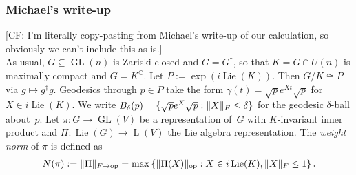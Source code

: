 \documentclass{article}
\DeclareMathOperator{\Lie}{Lie}
\DeclareMathOperator{\Lin}{L}
\DeclareMathOperator{\ope}{op}
\DeclarePairedDelimiter{\norm}{\lVert}{\rVert}
\newcommand{\ot}{\otimes}
\newcommand\GL{\operatorname{GL}}
\newcommand{\CF}[1]{{\color{purple}[CF: #1]}}
\begin{document}



\subsubsection{Michael's write-up}
\CF{I'm literally copy-pasting from Michael's write-up of our calculation, so obviously we can't include this as-is.}\\
As usual, $G \subseteq \GL(n)$ is Zariski closed and $G = G^\dagger$, so that $K = G \cap U(n)$ is maximally compact and $G = K^{\mathbb C}$.
Let $P := \exp(i\Lie(K))$. Then $G/K \cong P$ via $g \mapsto g^\dagger g$.
Geodesics through $p\in P$ take the form $\gamma(t) = \sqrt p e^{Xt} \sqrt p$ for $X\in i\Lie(K)$.
We write $B_\delta(p) = \{ \sqrt p e^X \sqrt p : \norm{X}_F \leq \delta \}$ for the geodesic $\delta$-ball about~$p$.
Let $\pi\colon G \to \GL(V)$ be a representation of~$G$ with $K$-invariant inner product and $\Pi\colon\Lie(G)\to\Lin(V)$ the Lie algebra representation.
The \emph{weight norm} of $\pi$ is defined as
\begin{align*}
  N(\pi) := \norm{\Pi}_{F\to\ope} = \max \left\{ \norm{\Pi(X)}_{\ope} : X \in i\Lie(K), \norm{X}_F \leq 1 \right\}.
\end{align*}
\end{document}
